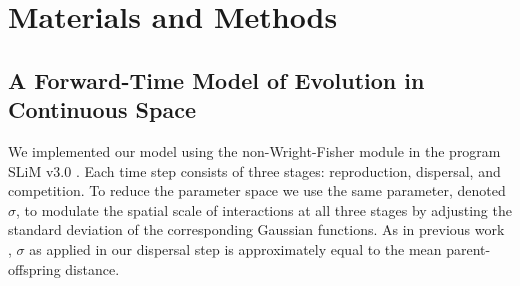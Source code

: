 \documentclass[9pt,twocolumn,twoside,lineno]{gsajnl}
\begin{document}

\section{Materials and Methods}
\label{sec:materials:methods}

\subsection{A Forward-Time Model of Evolution in Continuous Space}

We implemented our model using the non-Wright-Fisher module in the program SLiM v3.0 \citep{Haller2019}. Each time step consists of three stages: reproduction, dispersal, and competition. To reduce the parameter space we use the same parameter, denoted $\sigma$, to modulate the spatial scale of interactions at all three stages by adjusting the standard deviation of the corresponding Gaussian functions. As in previous work \citep{Wright1943,Ringbauer2017}, $\sigma$ as applied in our dispersal step is approximately equal to the mean parent-offspring distance.  
\end{document}
